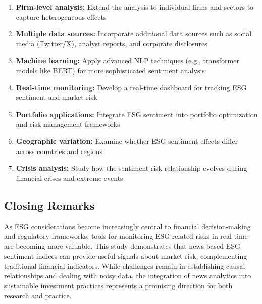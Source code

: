 \documentclass[12pt,a4paper]{article}
\begin{document}
\begin{enumerate}[itemsep=0.5em]
    \item \textbf{Firm-level analysis:} Extend the analysis to individual firms and sectors to capture heterogeneous effects
    
    \item \textbf{Multiple data sources:} Incorporate additional data sources such as social media (Twitter/X), analyst reports, and corporate disclosures
    
    \item \textbf{Machine learning:} Apply advanced NLP techniques (e.g., transformer models like BERT) for more sophisticated sentiment analysis
    
    \item \textbf{Real-time monitoring:} Develop a real-time dashboard for tracking ESG sentiment and market risk
    
    \item \textbf{Portfolio applications:} Integrate ESG sentiment into portfolio optimization and risk management frameworks
    
    \item \textbf{Geographic variation:} Examine whether ESG sentiment effects differ across countries and regions
    
    \item \textbf{Crisis analysis:} Study how the sentiment-risk relationship evolves during financial crises and extreme events
\end{enumerate}

\subsection{Closing Remarks}
\label{subsec:closing}

As ESG considerations become increasingly central to financial decision-making and regulatory frameworks, tools for monitoring ESG-related risks in real-time are becoming more valuable. This study demonstrates that news-based ESG sentiment indices can provide useful signals about market risk, complementing traditional financial indicators. While challenges remain in establishing causal relationships and dealing with noisy data, the integration of news analytics into sustainable investment practices represents a promising direction for both research and practice.

\clearpage

\end{document}
